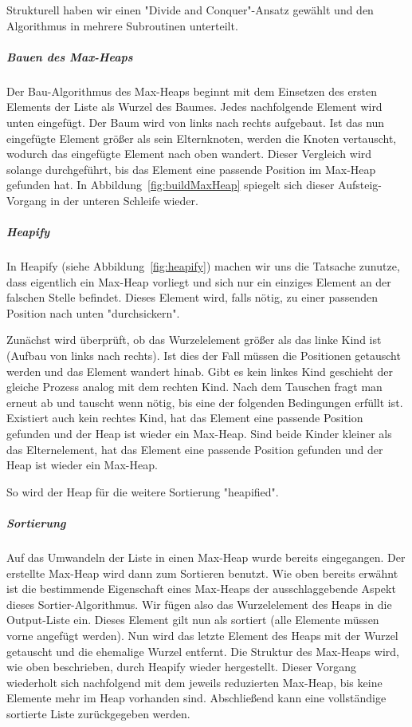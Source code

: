 Strukturell haben wir einen "Divide and Conquer"-Ansatz gewählt und den
Algorithmus in mehrere Subroutinen unterteilt.

\subparagraph{Bauen des Max-Heaps}
Der Bau-Algorithmus des Max-Heaps beginnt mit dem Einsetzen des ersten
Elements der Liste als Wurzel des Baumes.
Jedes nachfolgende Element wird unten eingefügt. Der Baum wird von links
nach rechts aufgebaut.
Ist das nun eingefügte Element größer als sein Elternknoten, werden die
Knoten vertauscht, wodurch das eingefügte Element nach oben wandert.
Dieser Vergleich wird solange durchgeführt, bis das Element eine passende
Position im Max-Heap gefunden hat.
In Abbildung~\ref{fig:buildMaxHeap} spiegelt sich dieser Aufsteig-Vorgang
in der unteren Schleife wieder.

\subparagraph{Heapify}
In Heapify (siehe Abbildung~\ref{fig:heapify}) machen wir uns die
Tatsache zunutze, dass eigentlich ein
Max-Heap vorliegt und sich nur ein einziges Element an der falschen
Stelle befindet.
Dieses Element wird, falls nötig, zu einer passenden Position nach unten
"durchsickern".

Zunächst wird überprüft, ob das Wurzelelement größer als das linke Kind
ist (Aufbau von links nach rechts).
Ist dies der Fall müssen die Positionen getauscht werden und das Element
wandert hinab.
Gibt es kein linkes Kind geschieht der gleiche Prozess analog mit dem
rechten Kind.
Nach dem Tauschen fragt man erneut ab und tauscht wenn nötig, bis eine
der folgenden Bedingungen erfüllt ist.
Existiert auch kein rechtes Kind, hat das Element eine passende Position
gefunden und der Heap ist wieder ein Max-Heap.
Sind beide Kinder kleiner als das Elternelement, hat das Element eine
passende Position gefunden und der Heap ist wieder ein Max-Heap.

So wird der Heap für die weitere Sortierung "heapified".

\subparagraph{Sortierung}
Auf das Umwandeln der Liste in einen Max-Heap wurde bereits eingegangen.
Der erstellte Max-Heap wird dann zum Sortieren benutzt.
Wie oben bereits erwähnt ist die bestimmende Eigenschaft eines Max-Heaps
der ausschlaggebende Aspekt dieses Sortier-Algorithmus.
Wir fügen also das Wurzelelement des Heaps in die Output-Liste ein.
Dieses Element gilt nun als sortiert (alle Elemente müssen vorne angefügt
werden).
Nun wird das letzte Element des Heaps mit der Wurzel getauscht und die
ehemalige Wurzel entfernt.
Die Struktur des Max-Heaps wird, wie oben beschrieben, durch Heapify
wieder hergestellt.
Dieser Vorgang wiederholt sich nachfolgend mit dem jeweils reduzierten
Max-Heap, bis keine Elemente mehr im Heap vorhanden sind.
Abschließend kann eine vollständige sortierte Liste zurückgegeben werden.

